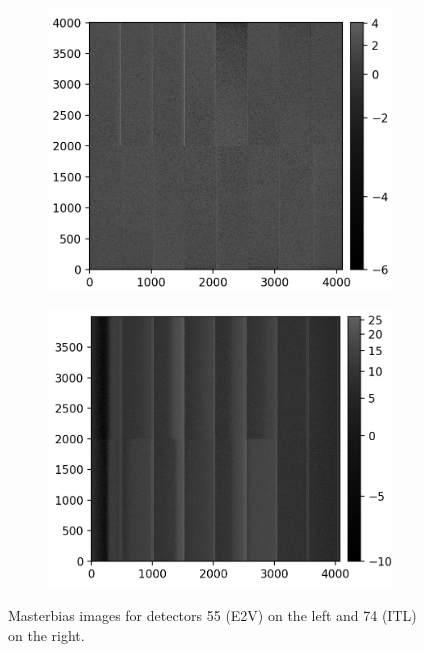 \begin{figure}[!htb]
     \centering
     \begin{subfigure}[b]{0.49\textwidth}
         \centering
         \includegraphics[width=\textwidth]{Figures/Super_bias_55.png}
     \end{subfigure}
     \hfill
     \begin{subfigure}[b]{0.49\textwidth}
         \centering
         \includegraphics[width=\textwidth]{Figures/Super_bias_74.png}
     \end{subfigure}
        \caption{Masterbias images for detectors 55 (E2V) on the left and 74 (ITL) on the right.}
        \label{fig:superbias}
\end{figure}

